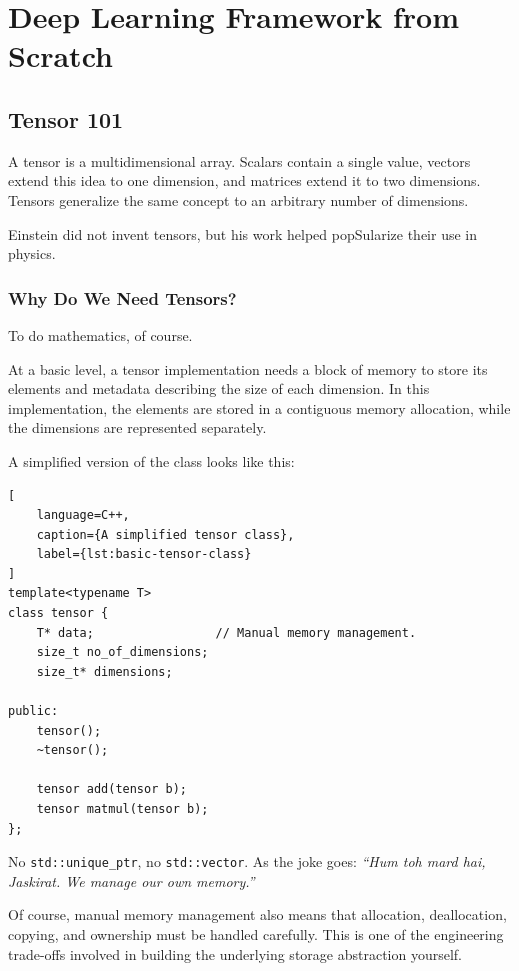 \chapter{Deep Learning Framework from Scratch}
\label{chap:deep-learning-framework-from-scratch}


\section{Tensor 101}

A tensor is a multidimensional array. Scalars contain a single value, vectors extend this idea to one dimension, and matrices extend it to two dimensions. Tensors generalize the same concept to an arbitrary number of dimensions.

Einstein did not invent tensors, but his work helped popSularize their use in physics.

\subsection{Why Do We Need Tensors?}

To do mathematics, of course.

At a basic level, a tensor implementation needs a block of memory to store its elements and metadata describing the size of each dimension. In this implementation, the elements are stored in a contiguous memory allocation, while the dimensions are represented separately.

A simplified version of the class looks like this:

\begin{lstlisting}[
    language=C++,
    caption={A simplified tensor class},
    label={lst:basic-tensor-class}
]
template<typename T>
class tensor {
    T* data;                 // Manual memory management.
    size_t no_of_dimensions;
    size_t* dimensions;

public:
    tensor();
    ~tensor();

    tensor add(tensor b);
    tensor matmul(tensor b);
};
\end{lstlisting}

No \texttt{std::unique\_ptr}, no \texttt{std::vector}. As the joke goes: \emph{``Hum toh mard hai, Jaskirat. We manage our own memory.''}

Of course, manual memory management also means that allocation, deallocation, copying, and ownership must be handled carefully. This is one of the engineering trade-offs involved in building the underlying storage abstraction yourself.


